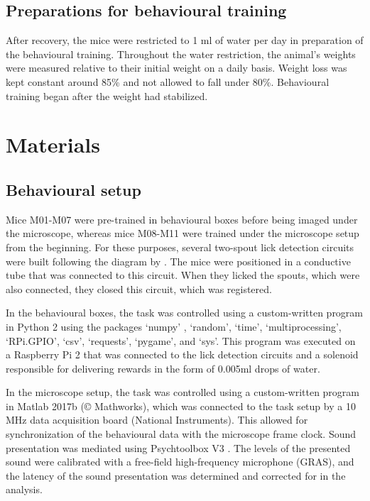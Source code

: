 \documentclass[]{report}
\theoremstyle{definition}
\theoremstyle{definition}
\theoremstyle{definition}
\theoremstyle{remark}
\begin{document}
\hypertarget{preparations-for-behavioural-training}{%
\subsection{Preparations for behavioural
training}\label{preparations-for-behavioural-training}}

After recovery, the mice were restricted to 1 ml of water per day in
preparation of the behavioural training. Throughout the water
restriction, the animal's weights were measured relative to their
initial weight on a daily basis. Weight loss was kept constant around
85\% and not allowed to fall under 80\%. Behavioural training began
after the weight had stabilized.

\hypertarget{materials}{%
\section{Materials}\label{materials}}

\hypertarget{behavioural-setup}{%
\subsection{Behavioural setup}\label{behavioural-setup}}

Mice M01-M07 were pre-trained in behavioural boxes before being imaged
under the microscope, whereas mice M08-M11 were trained under the
microscope setup from the beginning. For these purposes, several
two-spout lick detection circuits were built following the diagram by
\citet{slotnick2009lick}. The mice were positioned in a conductive tube
that was connected to this circuit. When they licked the spouts, which
were also connected, they closed this circuit, which was registered.

In the behavioural boxes, the task was controlled using a custom-written
program in Python 2 \citep{python} using the packages `numpy'
\citep{oliphant2006numpy, vanderwalt2011numpy}, `random', `time',
`multiprocessing', `RPi.GPIO', `csv', `requests', `pygame', and `sys'.
This program was executed on a Raspberry Pi 2 that was connected to the
lick detection circuits and a solenoid responsible for delivering
rewards in the form of 0.005ml drops of water.

In the microscope setup, the task was controlled using a custom-written
program in Matlab 2017b (© Mathworks), which was connected to the task
setup by a 10 MHz data acquisition board (National Instruments). This
allowed for synchronization of the behavioural data with the microscope
frame clock. Sound presentation was mediated using Psychtoolbox V3
\citep{brainard1997psychtoolbox, pelli1997psychtoolbox, kleiner2007psychtoolbox}.
The levels of the presented sound were calibrated with a free-field
high-frequency microphone (GRAS), and the latency of the sound
presentation was determined and corrected for in the analysis.
\end{document}
